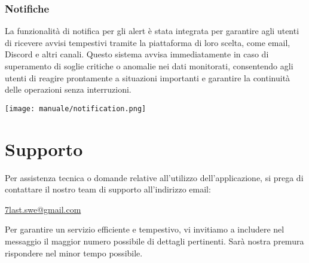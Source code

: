 \subsubsection{Notifiche}
La funzionalità di notifica per gli alert è stata integrata per garantire agli utenti di ricevere avvisi tempestivi tramite la piattaforma di loro scelta, come email, Discord e altri canali. Questo sistema avvisa immediatamente in caso di superamento di soglie critiche o anomalie nei dati monitorati, consentendo agli utenti di reagire prontamente a situazioni importanti e garantire la continuità delle operazioni senza interruzioni.
\begin{center}
    \texttt{[image: manuale/notification.png]}
\end{center} 

\newpage
\section{Supporto}
Per assistenza tecnica o domande relative all’utilizzo dell’applicazione, si prega di contattare il nostro team di supporto all'indirizzo email: 
\begin{center}
    \href{mailto:7last.swe@gmail.com}{7last.swe@gmail.com}
\end{center} 
Per garantire un servizio efficiente e tempestivo, vi invitiamo a includere nel messaggio il maggior numero possibile di dettagli pertinenti. Sarà nostra premura rispondere nel minor tempo possibile.